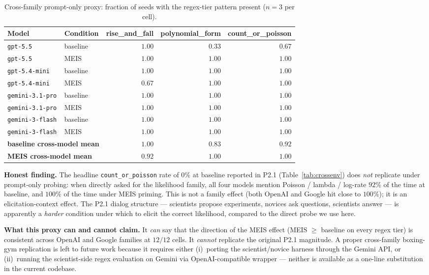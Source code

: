 \documentclass{article}
\begin{document}
\begin{table}[h]
\centering
\caption{Cross-family prompt-only proxy: fraction of seeds with the
regex-tier pattern present ($n = 3$ per cell).}
\label{tab:crossfamily-proxy}
\small
\begin{tabular}{llrrr}
\toprule
Model & Condition & rise\_and\_fall & polynomial\_form & count\_or\_poisson \\
\midrule
\texttt{gpt-5.5}           & baseline & $1.00$ & $0.33$ & $0.67$ \\
\texttt{gpt-5.5}           & MEIS     & $1.00$ & $1.00$ & $1.00$ \\
\texttt{gpt-5.4-mini}      & baseline & $1.00$ & $1.00$ & $1.00$ \\
\texttt{gpt-5.4-mini}      & MEIS     & $0.67$ & $1.00$ & $1.00$ \\
\texttt{gemini-3.1-pro}    & baseline & $1.00$ & $1.00$ & $1.00$ \\
\texttt{gemini-3.1-pro}    & MEIS     & $1.00$ & $1.00$ & $1.00$ \\
\texttt{gemini-3-flash}    & baseline & $1.00$ & $1.00$ & $1.00$ \\
\texttt{gemini-3-flash}    & MEIS     & $1.00$ & $1.00$ & $1.00$ \\
\midrule
\multicolumn{2}{l}{\textbf{baseline cross-model mean}} & $1.00$ & $0.83$ & $\mathbf{0.92}$ \\
\multicolumn{2}{l}{\textbf{MEIS cross-model mean}}     & $0.92$ & $1.00$ & $\mathbf{1.00}$ \\
\bottomrule
\end{tabular}
\end{table}

\textbf{Honest finding.} The headline \texttt{count\_or\_poisson}
rate of $0\%$ at baseline reported in P2.1
(Table~\ref{tab:crossenv}) does \emph{not} replicate under
prompt-only probing: when directly asked for the likelihood family,
all four models mention Poisson / lambda / log-rate $92\%$ of the
time at baseline, and $100\%$ of the time under MEIS priming. This
is not a family effect (both OpenAI and Google hit close to
$100\%$); it is an elicitation-context effect. The P2.1 dialog
structure --- scientists propose experiments, novices ask
questions, scientists answer --- is apparently a \emph{harder}
condition under which to elicit the correct likelihood, compared to
the direct probe we use here.

\textbf{What this proxy can and cannot claim.} It \emph{can} say
that the direction of the MEIS effect (MEIS $\geq$ baseline on every
regex tier) is consistent across OpenAI and Google families at $12 /
12$ cells. It \emph{cannot} replicate the original P2.1 magnitude.
A proper cross-family boxing-gym replication is left to future work
because it requires either (i)~porting the scientist/novice harness
through the Gemini API, or (ii)~running the scientist-side regex
evaluation on Gemini via OpenAI-compatible wrapper --- neither is
available as a one-line substitution in the current codebase.
\end{document}

